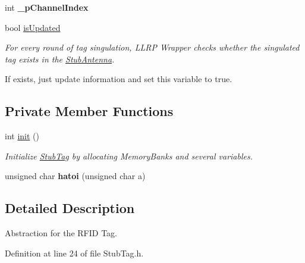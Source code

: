 \begin{DoxyCompactItemize}
\item 
\hypertarget{class_e_l_f_i_n_1_1_stub_tag_a2db71eee957cdb37415efad564aa8c79}{int {\bfseries \-\_\-p\-Channel\-Index}}\label{class_e_l_f_i_n_1_1_stub_tag_a2db71eee957cdb37415efad564aa8c79}

\item 
bool \hyperlink{class_e_l_f_i_n_1_1_stub_tag_a999ab50f0ec8aac7e849fdd83d47705f}{is\-Updated}
\begin{DoxyCompactList}\small\item\em For every round of tag singulation, L\-L\-R\-P Wrapper checks whether the singulated tag exists in the \hyperlink{class_e_l_f_i_n_1_1_stub_antenna}{Stub\-Antenna}.\par
If exists, just update information and set this variable to true. \end{DoxyCompactList}\end{DoxyCompactItemize}
\subsection*{Private Member Functions}
\begin{DoxyCompactItemize}
\item 
int \hyperlink{class_e_l_f_i_n_1_1_stub_tag_a41ae74073d2499adfebf29166452fc45}{init} ()
\begin{DoxyCompactList}\small\item\em Initialize \hyperlink{class_e_l_f_i_n_1_1_stub_tag}{Stub\-Tag} by allocating Memory\-Banks and several variables. \end{DoxyCompactList}\item 
\hypertarget{class_e_l_f_i_n_1_1_stub_tag_adbc7a48d38dc993b538a31b76ec8003f}{unsigned char {\bfseries hatoi} (unsigned char a)}\label{class_e_l_f_i_n_1_1_stub_tag_adbc7a48d38dc993b538a31b76ec8003f}

\end{DoxyCompactItemize}


\subsection{Detailed Description}
Abstraction for the R\-F\-I\-D Tag. 

Definition at line 24 of file Stub\-Tag.\-h.



